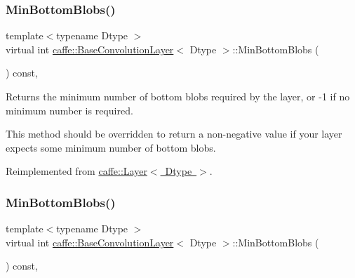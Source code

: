 \subsubsection{\texorpdfstring{Min\+Bottom\+Blobs()}{MinBottomBlobs()}\hspace{0.1cm}{\footnotesize\ttfamily [1/2]}}
{\footnotesize\ttfamily template$<$typename Dtype $>$ \\
virtual int \mbox{\hyperlink{classcaffe_1_1_base_convolution_layer}{caffe\+::\+Base\+Convolution\+Layer}}$<$ Dtype $>$\+::Min\+Bottom\+Blobs (\begin{DoxyParamCaption}{ }\end{DoxyParamCaption}) const\hspace{0.3cm}{\ttfamily [inline]}, {\ttfamily [virtual]}}



Returns the minimum number of bottom blobs required by the layer, or -\/1 if no minimum number is required. 

This method should be overridden to return a non-\/negative value if your layer expects some minimum number of bottom blobs. 

Reimplemented from \mbox{\hyperlink{classcaffe_1_1_layer_aca3cb2bafaefda5d4760aaebd0b72def}{caffe\+::\+Layer$<$ Dtype $>$}}.

\mbox{\label{classcaffe_1_1_base_convolution_layer_aa3d861ed15f6e41c6257d6a10defa7eb}} 
\subsubsection{\texorpdfstring{Min\+Bottom\+Blobs()}{MinBottomBlobs()}\hspace{0.1cm}{\footnotesize\ttfamily [2/2]}}
{\footnotesize\ttfamily template$<$typename Dtype $>$ \\
virtual int \mbox{\hyperlink{classcaffe_1_1_base_convolution_layer}{caffe\+::\+Base\+Convolution\+Layer}}$<$ Dtype $>$\+::Min\+Bottom\+Blobs (\begin{DoxyParamCaption}{ }\end{DoxyParamCaption}) const\hspace{0.3cm}{\ttfamily [inline]}, {\ttfamily [virtual]}}



